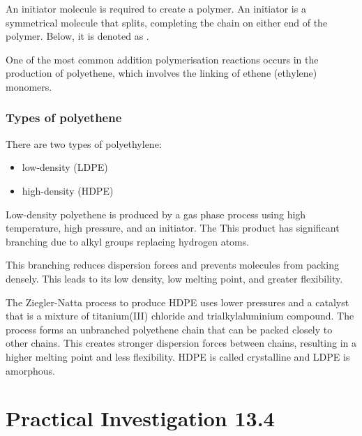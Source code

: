 		An initiator molecule is required to create a polymer. An initiator is a symmetrical molecule that splits, completing the chain on either end of the polymer. Below, it is denoted as .

		One of the most common addition polymerisation reactions occurs in the production of polyethene, which involves the linking of ethene (ethylene) monomers.

		\begin{center}
		\end{center}
		\begin{center}
		\end{center}

		\subsubsection{Types of polyethene}

		There are two types of polyethylene:

			\begin{itemize}
				\item low-density (LDPE)
				\item high-density (HDPE)
			\end{itemize}

		Low-density polyethene is produced by a gas phase process using high temperature, high pressure, and an initiator. The This product has significant branching due to alkyl groups replacing hydrogen atoms.

		This branching reduces dispersion forces and prevents molecules from packing densely. This leads to its low density, low melting point, and greater flexibility.

		The Ziegler-Natta process to produce HDPE uses lower pressures and a catalyst that is a mixture of titanium(III) chloride and trialkylaluminium compound. The process forms an unbranched polyethene chain that can be packed closely to other chains. This creates stronger dispersion forces between chains, resulting in a higher melting point and less flexibility. HDPE is called crystalline and LDPE is amorphous.

\section{Practical Investigation 13.4}


